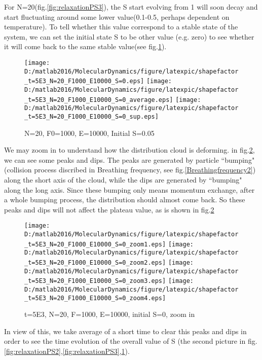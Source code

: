 \documentclass[aps,pre,twocolumn
,groupedaddress]{revtex4-1}
\begin{document}
For N=20(fig.\ref{fig:relaxationPS3}), the S start evolving from 1 will soon decay and start fluctuating around some lower value(0.1-0.5, perhaps dependent on temperature). To tell whether this value correspond to a stable state of the system, we can set the initial state S to be other value (e.g. zero) to see whether it will come back to the same stable value(see fig.\ref{fig:relaxationPS4}).

\begin{figure}
\centering
\texttt{[image: D:/matlab2016/MolecularDynamics/figure/latexpic/shapefactor\_t=5E3\_N=20\_F1000\_E10000\_S=0.eps]} 
\texttt{[image: D:/matlab2016/MolecularDynamics/figure/latexpic/shapefactor\_t=5E3\_N=20\_F1000\_E10000\_S=0\_average.eps]}
\texttt{[image: D:/matlab2016/MolecularDynamics/figure/latexpic/shapefactor\_t=5E3\_N=20\_F1000\_E10000\_S=0\_sup.eps]}
\caption{N=20, F0=1000, E=10000, Initial S=0.05}
\label{fig:relaxationPS4}
\end{figure}

We may zoom in to understand how the distribution cloud is deforming. 
in fig.\ref{fig:relaxationPS5}, we can see some peaks and dips. The peaks are generated by particle ``bumping" (collision process discribed in Breathing frequency, see fig.\ref{Breathingfrequency2}) along the short axis of the cloud, while the dips are generated by ``bumping" along the long axis. Since these bumping only means momentum exchange, after a whole bumping process, the distribution should almost come back. So these peaks and dips will not affect the plateau value, as is shown in fig.\ref{fig:relaxationPS5}
\begin{figure}[hbtp]
\centering
\texttt{[image: D:/matlab2016/MolecularDynamics/figure/latexpic/shapefactor\_t=5E3\_N=20\_F1000\_E10000\_S=0\_zoom1.eps]}
\texttt{[image: D:/matlab2016/MolecularDynamics/figure/latexpic/shapefactor\_t=5E3\_N=20\_F1000\_E10000\_S=0\_zoom2.eps]} 
\texttt{[image: D:/matlab2016/MolecularDynamics/figure/latexpic/shapefactor\_t=5E3\_N=20\_F1000\_E10000\_S=0\_zoom3.eps]} 
\texttt{[image: D:/matlab2016/MolecularDynamics/figure/latexpic/shapefactor\_t=5E3\_N=20\_F1000\_E10000\_S=0\_zoom4.eps]} 
\caption{t=5E3, N=20, F=1000, E=10000, initial S=0, zoom in}
\label{fig:relaxationPS5}
\end{figure}

In view of this, we take average of a short time to clear this peaks and dips in order to see the time evolution of the overall value of S (the second picture in fig.\ref{fig:relaxationPS2},\ref{fig:relaxationPS3},\ref{fig:relaxationPS4}).
\end{document}
